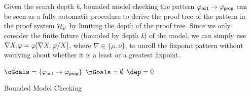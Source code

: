 \documentclass{almostllncs}
\begin{document}
Given the search depth \emph{k}, bounded model checking the pattern $\varphi_{\textnormal{\textsf{init}}} \to \varphi_{\textnormal{\textsf{prop}}}$ can be seen as a fully automatic procedure to derive the proof tree of the pattern in the proof system $\mathcal{H}_\mu$ by limiting the depth of the proof tree.
Since we only consider the finite future (bounded by depth \emph{k}) of the model,
we can simply use $\nabla X \mathord{.} \varphi = \varphi [ \nabla X \mathord{.} \, \varphi / X ]$, where $\nabla \in \{ \mu, \nu \}$, to unroll the fixpoint pattern without worrying about whether it is a least or a greatest fixpoint.

\begin{algorithm}

$\cGoals = \{\varphi_\init \imp \varphi_\prop\}$\;
$\nGoals = \emptyset$\;
$\dep = 0$\;
\caption{Bounded Model Checking} \label{algorithm:BMC}
\end{algorithm}
\end{document}
